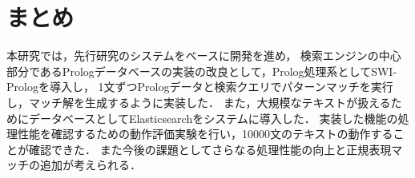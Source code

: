 \documentclass{FITpaper}
\begin{document}
\section{まとめ}
  本研究では，先行研究のシステムをベースに開発を進め，
  検索エンジンの中心部分であるPrologデータベースの実装の改良として，Prolog処理系としてSWI-Prologを導入し，
  1文ずつPrologデータと検索クエリでパターンマッチを実行し，マッチ解を生成するように実装した．
  また，大規模なテキストが扱えるためにデータベースとしてElasticsearchをシステムに導入した．
  実装した機能の処理性能を確認するための動作評価実験を行い，10000文のテキストの動作することが確認できた．
  また今後の課題としてさらなる処理性能の向上と正規表現マッチの追加が考えられる．




\end{document}
